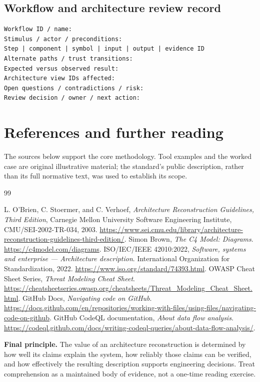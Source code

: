 \documentclass[11pt,letterpaper]{article}
\begin{document}
\subsection{Workflow and architecture review record}
\begin{lstlisting}
Workflow ID / name:
Stimulus / actor / preconditions:
Step | component | symbol | input | output | evidence ID
Alternate paths / trust transitions:
Expected versus observed result:
Architecture view IDs affected:
Open questions / contradictions / risk:
Review decision / owner / next action:
\end{lstlisting}
\clearpage
\section{References and further reading}
\renewcommand{\refname}{}
The sources below support the core methodology. Tool examples and the worked case are original illustrative material; the standard's public description, rather than its full normative text, was used to establish its scope.
\begingroup
\renewcommand{\section}[2]{}
\begin{thebibliography}{99}
\raggedright
{} L. O'Brien, C. Stoermer, and C. Verhoef, \emph{Architecture Reconstruction Guidelines, Third Edition}, Carnegie Mellon University Software Engineering Institute, CMU/SEI-2002-TR-034, 2003. \url{https://www.sei.cmu.edu/library/architecture-reconstruction-guidelines-third-edition/}.
 Simon Brown, \emph{The C4 Model: Diagrams}. \url{https://c4model.com/diagrams}.
 ISO/IEC/IEEE 42010:2022, \emph{Software, systems and enterprise --- Architecture description}. International Organization for Standardization, 2022. \url{https://www.iso.org/standard/74393.html}.
 OWASP Cheat Sheet Series, \emph{Threat Modeling Cheat Sheet}. \url{https://cheatsheetseries.owasp.org/cheatsheets/Threat_Modeling_Cheat_Sheet.html}.
 GitHub Docs, \emph{Navigating code on GitHub}. \url{https://docs.github.com/en/repositories/working-with-files/using-files/navigating-code-on-github}.
 GitHub CodeQL documentation, \emph{About data flow analysis}. \url{https://codeql.github.com/docs/writing-codeql-queries/about-data-flow-analysis/}.
\end{thebibliography}
\endgroup
\vspace{8pt}
\textbf{Final principle.} The value of an architecture reconstruction is determined by how well its claims explain the system, how reliably those claims can be verified, and how effectively the resulting description supports engineering decisions. Treat comprehension as a maintained body of evidence, not a one-time reading exercise.
\end{document}
